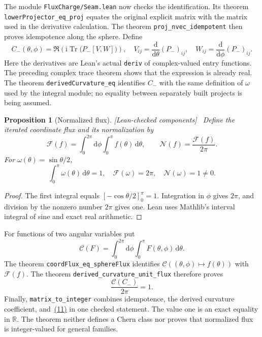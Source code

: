 \documentclass[11pt]{article}
\newtheorem{proposition}[theorem]{Proposition}
\theoremstyle{definition}\newtheorem{definition}[theorem]{Definition}
\theoremstyle{remark}\newtheorem{remark}[theorem]{Remark}
\newcommand{\Tr}{\operatorname{Tr}}
\newcommand{\ii}{\mathrm{i}}
\newcommand{\dd}{\mathrm{d}}
\newcommand{\R}{\mathbb{R}}
\newcommand{\checked}{\textnormal{\small[Lean-checked components]}\ }
\begin{document}
The module \texttt{FluxCharge/Seam.lean} now checks the identification. Its theorem \texttt{lowerProjector\_eq\_proj} equates the original explicit matrix with the matrix used in the derivative calculation. The theorem \texttt{proj\_nvec\_idempotent} then proves idempotence along the sphere. Define
\hypertarget{eq:derived}{}
\begin{equation}
 C_-(\theta,\phi)=\Re\!\left(\ii\Tr\bigl(P_-[V,W]\bigr)\right),\quad
 V_{ij}=\frac{\dd}{\dd\theta}(P_-)_{ij},\quad
 W_{ij}=\frac{\dd}{\dd\phi}(P_-)_{ij}.
\end{equation}
Here the derivatives are Lean's actual \texttt{deriv} of complex-valued entry functions. The preceding complex trace theorem shows that the expression is already real. The theorem \texttt{derivedCurvature\_eq} identifies $C_-$ with the same definition of $\omega$ used by the integral module; no equality between separately built projects is being assumed.

\begin{proposition}[Normalized flux]\label{prop:flux}\checked
Define the iterated coordinate flux and its normalization by
\hypertarget{eq:fluxdef}{}
\begin{equation}
 \mathcal F(f)=\int_0^{2\pi}\!\dd\phi\int_0^\pi f(\theta)\,\dd\theta,
 \qquad \mathcal N(f)=\frac{\mathcal F(f)}{2\pi}.
\end{equation}
For $\omega(\theta)=\sin\theta/2$,
\hypertarget{eq:unit}{}
\begin{equation}
 \int_0^\pi\omega(\theta)\,\dd\theta=1,\quad
 \mathcal F(\omega)=2\pi,\quad \mathcal N(\omega)=1\neq0.
\end{equation}
\end{proposition}
\begin{proof}
The first integral equals $[-\cos\theta/2]_0^\pi=1$. Integration in $\phi$ gives $2\pi$, and division by the nonzero number $2\pi$ gives one. Lean uses Mathlib's interval integral of sine and exact real arithmetic.
\end{proof}
For functions of two angular variables put
\hypertarget{eq:coordflux}{}
\begin{equation}
 \mathcal C(F)=\int_0^{2\pi}\!\dd\phi\int_0^\pi F(\theta,\phi)\,\dd\theta.
\end{equation}
The theorem \texttt{coordFlux\_eq\_sphereFlux} identifies $\mathcal C((\theta,\phi)\mapsto f(\theta))$ with $\mathcal F(f)$. The theorem \texttt{derived\_curvature\_unit\_flux} therefore proves
\hypertarget{eq:derivedflux}{}
\begin{equation}
 \frac{\mathcal C(C_-)}{2\pi}=1.
\end{equation}
Finally, \texttt{matrix\_to\_integer} combines idempotence, the derived curvature coefficient, and~\hyperref[eq:derivedflux]{(11)} in one checked statement. The value one is an exact equality in $\R$. The theorem neither defines a Chern class nor proves that normalized flux is integer-valued for general families.
\end{document}
